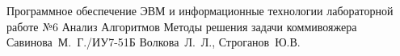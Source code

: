 \documentclass{bmstu}
\begin{document}
	
	{Программное обеспечение ЭВМ и информационные технологии}
	{лабораторной работе №6}
	{Анализ Алгоритмов}
	{Методы решения задачи коммивояжера}
	{}
	{Савинова~М.~Г./ИУ7-51Б}
	{Волкова~Л.~Л., Строганов~Ю.В.}
	
	\maketableofcontents
	
	
	
	
	
	
	
	
	\makebibliography
	
\end{document}
